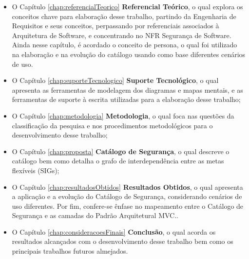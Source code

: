 \begin{itemize}
	\item O Capítulo \ref{chap:referencialTeorico} \textbf{Referencial Teórico}, o qual explora os conceitos chave para elaboração desse trabalho, partindo da Engenharia de Requisitos e seus conceitos, perpassando por referenciais associados à Arquitetura de Software, e concentrando no NFR Segurança de Software. Ainda nesse capítulo, é acordado o conceito de persona, o qual foi utilizado na elaboração e na evolução do catálogo usando como base diferentes cenários de uso.
	
	\item  O Capítulo \ref{chap:suporteTecnologico} \textbf{Suporte Tecnológico}, o qual apresenta as ferramentas de modelagem dos diagramas e mapas mentais, e as ferramentas de suporte à escrita utilizadas para a elaboração desse trabalho;
	
	\item O Capítulo \ref{chap:metodologia} \textbf{Metodologia}, o qual foca nas questões da classificação da pesquisa e nos procedimentos metodológicos para o desenvolvimento desse trabalho;
	
	\item O Capítulo \ref{chap:proposta} \textbf{Catálogo de Segurança}, o qual descreve o catálogo bem como detalha o grafo de interdependência entre as metas flexíveis (SIGs);
	
	\item  O Capítulo  \ref{chap:resultadosObtidos} \textbf{Resultados Obtidos}, o qual apresenta a aplicação e a evolução do Catálogo de Segurança, considerando cenários de uso diferentes. Por fim, confere-se ênfase no mapeamento entre o Catálogo de Segurança e as camadas do Padrão Arquitetural MVC.. 
	
	\item  O Capítulo \ref{chap:consideracoesFinais} \textbf{Conclusão}, o qual acorda os resultados alcançados com o desenvolvimento desse trabalho bem como os principais trabalhos futuros almejados. 
\end{itemize}

